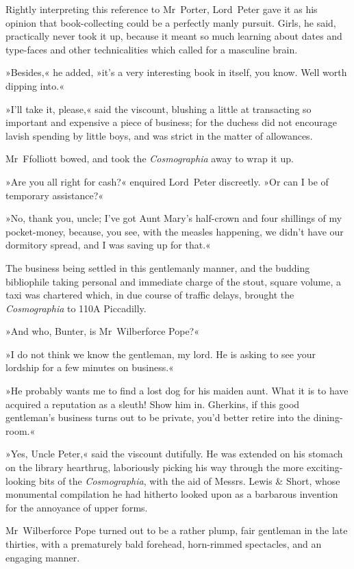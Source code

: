 Rightly interpreting this reference to Mr~Porter, Lord~Peter gave it as his opinion that book-collecting could be a perfectly manly pursuit. Girls, he said, practically never took it up, because it meant so much learning about dates and type-faces and other technicalities which called for a masculine brain.

»Besides,« he added, »it's a very interesting book in itself, you know. Well worth dipping into.«

»I'll take it, please,« said the viscount, blushing a little at transacting so important and expensive a piece of business; for the duchess did not encourage lavish spending by little boys, and was strict in the matter of allowances.

Mr~Ffolliott bowed, and took the \textit{Cosmographia} away to wrap it up.

»Are you all right for cash?« enquired Lord~Peter discreetly. »Or can I be of temporary assistance?«

»No, thank you, uncle; I've got Aunt Mary's half-crown and four shillings of my pocket-money, because, you see, with the measles happening, we didn't have our dormitory spread, and I was saving up for that.«

The business being settled in this gentlemanly manner, and the budding bibliophile taking personal and immediate charge of the stout, square volume, a taxi was chartered which, in due course of traffic delays, brought the \textit{Cosmographia} to 110A Piccadilly.

\divider\pagebreak[2]

»And who, Bunter, is Mr~Wilberforce Pope?«

»I do not think we know the gentleman, my lord. He is asking to see your lordship for a few minutes on business.«

»He probably wants me to find a lost dog for his maiden aunt. What it is to have acquired a reputation as a sleuth! Show him in. Gherkins, if this good gentleman's business turns out to be private, you'd better retire into the dining-room.«

»Yes, Uncle Peter,« said the viscount dutifully. He was extended on his stomach on the library hearthrug, laboriously picking his way through the more exciting-looking bits of the \textit{Cosmographia}, with the aid of Messrs. Lewis \& Short, whose monumental compilation he had hitherto looked upon as a barbarous invention for the annoyance of upper forms.

Mr~Wilberforce Pope turned out to be a rather plump, fair gentleman in the late thirties, with a prematurely bald forehead, horn-rimmed spectacles, and an engaging manner.


